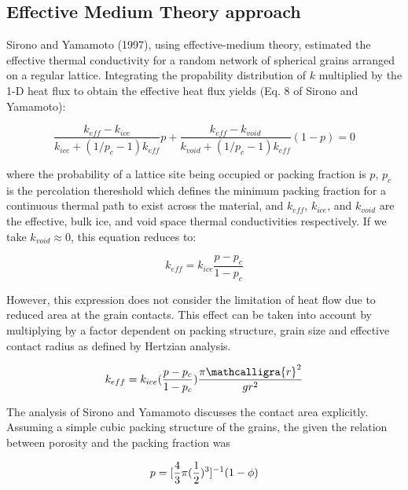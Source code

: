 \documentclass[11pt]{article} %
\newcommand{\sr}{\ensuremath{\mathcalligra{r}} \xspace}
\begin{document}
\begin{itemize}
\subsection{Effective Medium Theory approach}

	Sirono and Yamamoto (1997), using effective-medium theory, estimated the effective thermal conductivity for a random network of spherical grains arranged on a regular lattice. Integrating the propability distribution of $k$ multiplied by the 1-D heat flux to obtain the effective heat flux yields (Eq. 8 of Sirono and Yamamoto):
	
	 \begin{equation}
	 \frac{k_{eff} - k_{ice}}{k_{ice} +(1/p_{c}-1)k_{eff}}p + \frac{k_{eff}-k_{void}}{k_{void}+(1/p_{c}-1)k_{eff}}(1-p)=0
	 \end{equation}

	 where the probability of a lattice site being occupied or packing fraction is $p$, $p_{c}$  is the percolation thereshold which defines the minimum packing fraction for a continuous thermal path to exist across the material, and $k_{eff}$, $k_{ice}$, and $k_{void}$ are the effective, bulk ice, and void space thermal conductivities respectively. If we take $k_{void} \approx 0$, this equation reduces to:

	\begin{equation}
	k_{eff} = k_{ice} \frac{p - p_{c}}{1 - p_{c}}
	\end{equation}
	 
	 However, this expression does not consider the limitation of heat flow due to reduced area at the grain contacts. This effect can be taken into account by multiplying by a factor dependent on packing structure, grain size and effective contact radius as defined by Hertzian analysis.
	 
	\begin{equation}
	k_{eff} = k_{ice} ( \frac{p - p_{c}}{1-p_{c}} )\frac{\pi \sr^{2}}{g r^{2}}
	\end{equation}

	The analysis of Sirono and Yamamoto discusses the contact area explicitly. Assuming a simple cubic packing structure of the grains, the given the relation between porosity and the packing fraction was 
	
	\begin{equation}
	p = [ \frac{4}{3} \pi ( \frac{1}{2})^{3} ]^{-1} (1 - \phi) \\
	\end{equation}
	

\end{itemize}
\end{document}
